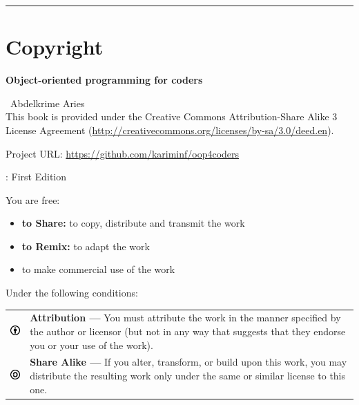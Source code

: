 \documentclass[12pt]{book}
\begin{document}
\fi

\newpage
\hrule
\chapter*{Copyright}
\begin{flushright}
{\Huge \textbf{Object-oriented programming for coders}}
\end{flushright}

  \textcopyright\ Abdelkrime Aries \\[0.5cm]
This book is provided under the Creative Commons Attribution-Share Alike 3 License Agreement (\url{http://creativecommons.org/licenses/by-sa/3.0/deed.en}).

\vspace{0.5cm}
\noindent
Project URL: \url{https://github.com/kariminf/oop4coders}

\vspace{1cm}
: \hspace{2cm} First Edition

\tiny
\vspace{1cm}
\noindent
You are free:
\begin{itemize}
\item \textbf{to Share:} to copy, distribute and transmit the work
\item \textbf{to Remix:} to adapt the work
\item to make commercial use of the work
\end{itemize}

\vspace{1cm}
\noindent
Under the following conditions:\\
\begin{tabular}{m{}m{}}
\includegraphics[width=1cm]{img/by.png} & 
\textbf{Attribution —} You must attribute the work in the manner specified by the author or licensor (but not in any way that suggests that they endorse you or your use of the work). \\
\includegraphics[width=1cm]{img/sa.png} &
\textbf{Share Alike —} If you alter, transform, or build upon this work, you may distribute the resulting work only under the same or similar license to this one.
\end{tabular}
\end{document}
